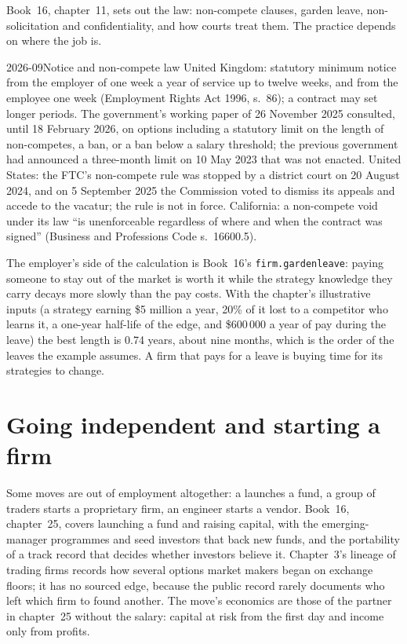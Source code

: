 Book~16, chapter~11, sets out the law: non-compete clauses, garden leave, non-solicitation and confidentiality, and how
courts treat them. The practice depends on where the job is.

\begin{dated}{2026-09}{Notice and non-compete law}\label{dat:in:career-paths-and-moves:law}
United Kingdom: statutory minimum notice from the employer of one week a year of service up to twelve weeks, and from
the employee one week (Employment Rights Act 1996, s.~86); a contract may set longer periods. The government's
working paper of 26 November 2025 consulted, until 18 February 2026, on options including a statutory limit on the
length of non-competes, a ban, or a ban below a salary threshold; the previous government had announced a three-month
limit on 10 May 2023 that was not enacted. United States: the FTC's non-compete rule was stopped by a district court on
20 August 2024, and on 5 September 2025 the Commission voted to dismiss its appeals and accede to the vacatur; the
rule is not in force. California: a non-compete void under its law ``is unenforceable regardless of where and when the
contract was signed'' (Business and Professions Code s.~16600.5).
\end{dated}

The employer's side of the calculation is Book~16's \texttt{firm.gardenleave}: paying someone to stay out of the market is
worth it while the strategy knowledge they carry decays more slowly than the pay costs. With the chapter's illustrative
inputs (a strategy earning \$5 million a year, 20\% of it lost to a competitor who learns it, a one-year half-life of the
edge, and \$600\,000 a year of pay during the leave) the best length is 0.74 years, about nine months, which is the order of
the leaves the example assumes. A firm that pays for a leave is buying time for its strategies to change.

\section{Going independent and starting a firm}

Some moves are out of employment altogether: a  launches a fund, a group of traders starts a
proprietary firm, an engineer starts a vendor. Book~16, chapter~25, covers launching a fund and raising capital, with the
emerging-manager programmes and seed investors that back new funds, and the portability of a track record that decides
whether investors believe it. Chapter~3's lineage of trading firms records how several options market makers began on
exchange floors; it has no sourced  edge, because the public record rarely documents who left which firm to
found another. The move's economics are those of the partner in chapter~25 without the salary: capital at risk from the
first day and income only from profits.

